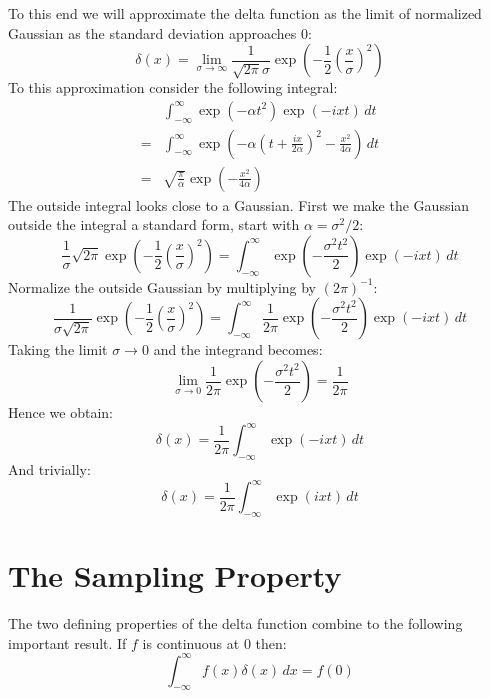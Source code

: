 To this end we will approximate the delta function as the limit of normalized Gaussian as the standard deviation approaches $0$:
\[\delta(x) = \lim_{\sigma\rightarrow\infty}\frac{1}{\sqrt{2\pi}\sigma}\exp\left(-\frac{1}{2}\left(\frac{x}{\sigma}\right)^2\right)\]
To this approximation consider the following integral:
\begin{equation*}
\begin{aligned}
	&\int_{-\infty}^{\infty}\exp(-\alpha t^2) \exp(-ixt)\,dt \\
	=&\int_{-\infty}^{\infty}\exp\left(-\alpha\left(t+\frac{ix}{2\alpha}\right)^2-\frac{x^2}{4\alpha}\right)\,dt\\
	=& \sqrt{\frac{\pi}{\alpha}}\exp\left(-\frac{x^2}{4\alpha}\right)
\end{aligned}
\end{equation*}
The outside integral looks close to a Gaussian.
First we make the Gaussian outside the integral a standard form, start with $\alpha = \sigma^2/2$:
\[\frac{1}{\sigma}\sqrt{2\pi}\exp\left(-\frac{1}{2}\left(\frac{x}{\sigma}\right)^2\right) = \int_{-\infty}^{\infty}\exp\left(-\frac{\sigma^2t^2}{2}\right)\exp(-ixt)\,dt\]
Normalize the outside Gaussian by multiplying by $(2\pi)^{-1}$:
\[\frac{1}{\sigma\sqrt{2\pi}}\exp\left(-\frac{1}{2}\left(\frac{x}{\sigma}\right)^2\right) = \int_{-\infty}^{\infty}\frac{1}{2\pi }\exp\left(-\frac{\sigma^2t^2}{2}\right)\exp(-ixt)\,dt\]
Taking the limit $\sigma \rightarrow 0$ and the integrand becomes:
\[\lim_{\sigma \rightarrow 0}\frac{1}{2\pi }\exp\left(-\frac{\sigma^2t^2}{2}\right)  = \frac{1}{2\pi} \]
Hence we obtain:
\[\delta(x) = \frac{1}{2\pi} \int_{-\infty}^{\infty}\exp(-ixt)\,dt\]
And trivially:
\[\delta(x) = \frac{1}{2\pi} \int_{-\infty}^{\infty}\exp(ixt)\,dt\]

\section{The Sampling Property}
The two defining properties of the delta function combine to the following important result.
If $f$ is continuous at $0$ then:
\[\int_{-\infty}^{\infty}f(x)\delta(x)\,dx = f(0)\]

